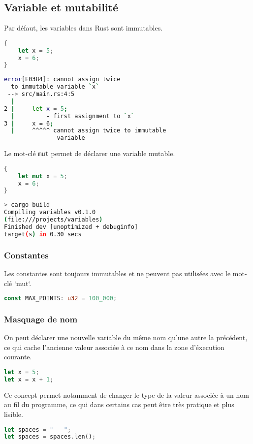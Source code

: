 \subsection{Variable et mutabilité}
\begin{frame}[fragile]
Par défaut, les variables dans Rust sont immutables.
  \begin{lstlisting}[language=rust]
{
    let x = 5;
    x = 6;
}
  \end{lstlisting}
  \begin{lstlisting}[language=bash]
error[E0384]: cannot assign twice
  to immutable variable `x`
 --> src/main.rs:4:5
  |
2 |     let x = 5;
  |         - first assignment to `x`
3 |     x = 6;
  |     ^^^^^ cannot assign twice to immutable
               variable
  \end{lstlisting}
\end{frame}

\begin{frame}[fragile]
  Le mot-clé \texttt{mut} permet de déclarer une variable mutable.
  \begin{lstlisting}[language=rust]
{
    let mut x = 5;
    x = 6;
}
  \end{lstlisting}

  \begin{lstlisting}[language=bash]
> cargo build
Compiling variables v0.1.0
(file:///projects/variables)
Finished dev [unoptimized + debuginfo]
target(s) in 0.30 secs
  \end{lstlisting}
\end{frame}

\begin{frame}[fragile]
  \frametitle{Constantes}
Les constantes sont toujours immutables et ne peuvent pas utilisées avec le mot-clé `mut`.
\begin{lstlisting}[language=rust]
const MAX_POINTS: u32 = 100_000;
\end{lstlisting}
\end{frame}

\begin{frame}[fragile]
  \frametitle{Masquage de nom}
On peut déclarer une nouvelle variable du même nom qu'une autre la précédent, ce qui cache l'ancienne valeur associée à ce nom dans la zone d'éxecution courante.
\begin{lstlisting}[language=rust]
let x = 5;
let x = x + 1;
\end{lstlisting}
Ce concept permet notamment de changer le type de la valeur associée à un nom au fil du programme, ce qui dans certains cas peut être très pratique et plus lisible.
\begin{lstlisting}[language=rust]
let spaces = "   ";
let spaces = spaces.len();
\end{lstlisting}
\end{frame}

